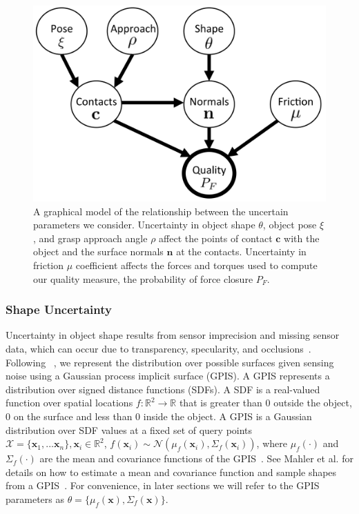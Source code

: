 \documentclass[10pt, conference]{ieeeconf}      %
\newcommand{\bc}{\mathbf{c}}
\newcommand{\bn}{\mathbf{n}}
\newcommand{\bx}{\mathbf{x}}
\newcommand{\mX}{\mathcal{X}}
\newcommand{\mN}{\mathcal{N}}
\begin{document}
\begin{figure}[ht!]
\centering
\includegraphics[scale=0.095]{figures/Graphical_Model.jpg}
\caption{A graphical model of the relationship between the uncertain parameters we consider. Uncertainty in object shape $\theta$, object pose $\xi$, and grasp approach angle $\rho$ affect the points of contact $\bc$ with the object and the surface normals $\bn$ at the contacts. Uncertainty in friction $\mu$ coefficient affects the forces and torques used to compute our quality measure, the probability of force closure $P_F$.  }
\vspace*{-10pt}
\label{fig:graphical_model}
\end{figure}

\subsubsection{Shape Uncertainty}

Uncertainty in object shape results from sensor imprecision and missing sensor data, which can occur due to transparency, specularity, and occlusions~\cite{mahler2015gp}.
Following ~\cite{mahler2015gp}, we represent the distribution over possible surfaces given sensing noise using a Gaussian process implicit surface (GPIS).
A GPIS represents a distribution over signed distance functions (SDFs).
A SDF is a real-valued function over spatial locations $f: \mathbb{R}^2 \rightarrow \mathbb{R}$ that is greater than 0 outside the object, 0 on the surface and less than 0 inside the object.
A GPIS is a Gaussian distribution over SDF values at a fixed set of query points $\mX = \{\bx_1, ... \bx_n\}, \bx_i \in \mathbb{R}^2$, $f(\bx_i) \sim \mN(\mu_{f}(\bx_i),\Sigma_{f}(\bx_i))$, where $\mu_{f}(\cdot)$ and $\Sigma_{f}(\cdot)$ are the mean and covariance functions of the GPIS~\cite{rasmussen2006}.
See Mahler et al. for details on how to estimate a mean and covariance function and sample shapes from a GPIS~\cite{mahler2015gp}.
For convenience, in later sections we will refer to the GPIS parameters as $\theta = \lbrace \mu_{f}(\bx), \Sigma_{f}(\bx) \rbrace$. 
\end{document}
